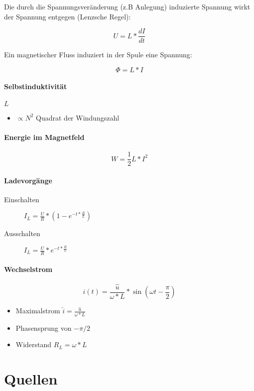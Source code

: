 Die durch die Spannungsveränderung (z.B Anlegung) induzierte Spannung wirkt der Spannung entgegen (Lenzsche Regel):

$$U = L * \frac{dI}{dt}$$

Ein magnetischer Fluss induziert in der Spule eine Spannung:

$$\Phi = L * I$$

\paragraph{Selbstinduktivität} $L$

\begin{itemize}
  \item $\propto N^2$ Quadrat der Windungszahl
\end{itemize}

\paragraph{Energie im Magnetfeld}

$$W = \frac{1}{2} L * I^2$$

\paragraph{Ladevorgänge}

\begin{description}
  \item[Einschalten] $I_L = \frac{U}{R} * (1 - e^{-t * \frac{R}{L}})$
  \item[Ausschalten] $I_L = \frac{U}{R} * e^{-t * \frac{R}{L}}$
\end{description}

\paragraph{Wechselstrom}

$$i(t) = \frac{\hat{u}}{\omega * L} * \sin (\omega t - \frac{\pi}{2})$$

\begin{itemize}
  \item Maximalstrom $\hat{i} = \frac{\hat{u}}{\omega * L}$
  \item Phasensprung von $-\pi/2$
  \item Widerstand $R_L = \omega * L$
\end{itemize}

\section{Quellen}


